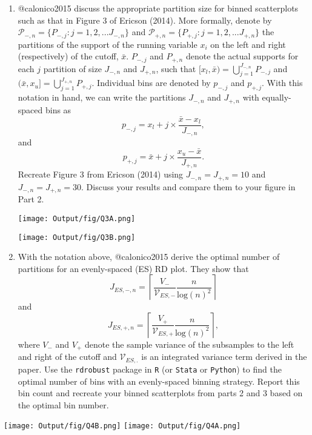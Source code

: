 \documentclass[
  12pt,
]{article}
\begin{document}
\begin{enumerate}
\def\labelenumi{\arabic{enumi}.}
\setcounter{enumi}{2}
\item
  @calonico2015 discuss the appropriate partition size for binned
  scatterplots such as that in Figure 3 of Ericson (2014). More
  formally, denote by
  \(\mathcal{P}_{-,n} = \{ P_{-,j} : j=1, 2, ... J_{-, n} \}\) and
  \(\mathcal{P}_{+,n} = \{ P_{+,j} : j=1, 2, ... J_{+, n} \}\) the
  partitions of the support of the running variable \(x_{i}\) on the
  left and right (respectively) of the cutoff, \(\bar{x}\). \(P_{-, j}\)
  and \(P_{+, n}\) denote the actual supports for each \(j\) partition
  of size \(J_{-,n}\) and \(J_{+,n}\), such that
  \([x_{l}, \bar{x}) = \bigcup_{j=1}^{J_{-,n}} P_{-, j}\) and
  \((\bar{x}, x_{u}] = \bigcup_{j=1}^{J_{+,n}} P_{+, j}\). Individual
  bins are denoted by \(p_{-,j}\) and \(p_{+,j}\). With this notation in
  hand, we can write the partitions \(J_{-,n}\) and \(J_{+,n}\) with
  equally-spaced bins as
  \[p_{-,j}=x_{l} + j \times \frac{\bar{x} - x_{l}}{J_{-,n}},\] and
  \[p_{+,j} = \bar{x} + j \times \frac{x_{u} - \bar{x}}{J_{+,n}}.\]
  Recreate Figure 3 from Ericson (2014) using \(J_{-,n}=J_{+,n}=10\) and
  \(J_{-,n}=J_{+,n}=30\). Discuss your results and compare them to your
  figure in Part 2.

  \texttt{[image: Output/fig/Q3A.png]}

  \texttt{[image: Output/fig/Q3B.png]}
\item
  With the notation above, @calonico2015 derive the optimal number of
  partitions for an evenly-spaced (ES) RD plot. They show that
  \[J_{ES,-,n} = \left\lceil \frac{V_{-}}{\mathcal{V}_{ES,-}} \frac{n}{\text{log}(n)^{2}} \right\rceil\]
  and
  \[J_{ES,+,n} = \left\lceil \frac{V_{+}}{\mathcal{V}_{ES,+}} \frac{n}{\text{log}(n)^{2}} \right\rceil,\]
  where \(V_{-}\) and \(V_{+}\) denote the sample variance of the
  subsamples to the left and right of the cutoff and
  \(\mathcal{V}_{ES,.}\) is an integrated variance term derived in the
  paper. Use the \texttt{rdrobust} package in \texttt{R} (or
  \texttt{Stata} or \texttt{Python}) to find the optimal number of bins
  with an evenly-spaced binning strategy. Report this bin count and
  recreate your binned scatterplots from parts 2 and 3 based on the
  optimal bin number.
\end{enumerate}

\texttt{[image: Output/fig/Q4B.png]}
\texttt{[image: Output/fig/Q4A.png]} \pagebreak
\end{document}
